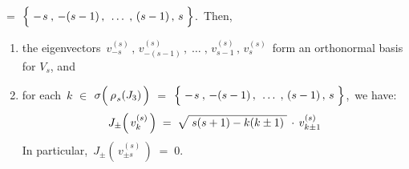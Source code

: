 \begin{theorem}
\begin{enumerate}
	$=$ $\left\{\;-\overset{{\color{white}-}}{s} \,,\, -(s-1) \,,\, \;\ldots\;,\, (s-1) \,,\, s\;\right\}$.\,
	Then, 
	\begin{enumerate}
	\item
		the eigenvectors
		\,$v^{(s)}_{-s} \,,\, v^{(s)}_{-(s-1)} \,,\; \ldots \;,\, v^{(s)}_{s-1} \,,\, v^{(s)}_{s}$\,
		form an orthonormal basis for $V_{s}$, and
	\item
		for each \,$k$ $\in$ $\sigma\!\left(\,\overset{{\color{white}-}}{\rho}_{s}(J_{3})\,\right)$
		$=$ $\left\{\;-\overset{{\color{white}-}}{s} \,,\, -(s-1) \,,\, \;\ldots\;,\, (s-1) \,,\, s\;\right\}$,\,
		we have:
		\begin{equation*}
		J_{\pm}\!\left(\,v^{(s)}_{k}\,\right)
		\; = \;
			\sqrt{{\color{white}.}
			s(s+1) - k(k \pm 1)
			{\color{white}.}}
			\,\cdot\,
			v^{(s)}_{k \pm 1}
		\end{equation*}
		In particular, \,$J_{\pm}\!\left(\,v^{(s)}_{\pm s}\,\right) \; = \; 0$.
	\end{enumerate}
\end{enumerate}
\end{theorem}


